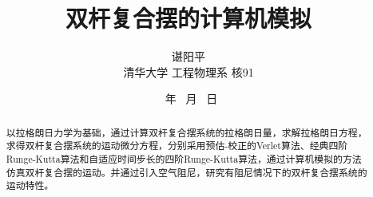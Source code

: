 \documentclass[a4paper,12pt,titlepage]{article}
\renewcommand{\today}{\number \year \ 年 \number \month \ 月 \number \day \ 日}
\begin{document}
\newtheorem{example}{例}             %
\newtheorem{algorithm}{算法}
\newtheorem{theorem}{定理}[section]  %
\newtheorem{definition}{定义}
\newtheorem{axiom}{公理}
\newtheorem{property}{性质}
\newtheorem{proposition}{命题}
\newtheorem{lemma}{引理}
\newtheorem{corollary}{推论}
\newtheorem{remark}{注解}
\newtheorem{condition}{条件}
\newtheorem{conclusion}{结论}
\newtheorem{assumption}{假设}

\renewcommand{\contentsname}{目录}     %
\renewcommand{\abstractname}{摘要}     %
\renewcommand{\refname}{参考文献}      %
\renewcommand{\indexname}{索引}
\renewcommand{\figurename}{图}
\renewcommand{\tablename}{表}
\renewcommand{\appendixname}{附录}
\renewcommand{\proofname}{证明}
\renewcommand{\algorithm}{算法}





\title{\huge{双杆复合摆的计算机模拟}}
\author{ 谌阳平 \\
清华大学 \quad 工程物理系 \quad 核91 }
\date{\today}
\maketitle

\tableofcontents



\begin{abstract}
以拉格朗日力学为基础，通过计算双杆复合摆系统的拉格朗日量，求解拉格朗日方程，求得双杆复合摆系统的运动微分方程，分别采用预估-校正的Verlet算法、经典四阶Runge-Kutta算法和自适应时间步长的四阶Runge-Kutta算法，通过计算机模拟的方法仿真双杆复合摆的运动。并通过引入空气阻尼，研究有阻尼情况下的双杆复合摆系统的运动特性。

\vskip 0.1in
\begin{flushleft}
\begin{minipage}{5.7in}
\\
\end{minipage}
\end{flushleft}
\end{abstract}
\end{document}
